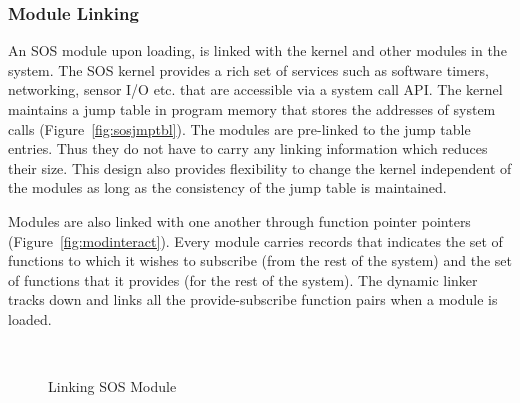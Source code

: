 \subsubsection{Module Linking}
\label{sec:soslinking}
%
An SOS module upon loading, is linked with the kernel and other
modules in the system. 
%
%
The SOS kernel provides a rich set of services such as software
timers, networking, sensor I/O etc. that are accessible via a system
call API.
%
The kernel maintains a jump table in program memory that stores the
addresses of system calls (Figure~\ref{fig:sosjmptbl}).
%
The modules are pre-linked to the jump table entries.
%
Thus they do not have to carry any linking information which reduces
their size.
%
This design also provides flexibility to change the kernel independent
of the modules as long as the consistency of the jump table is maintained.
%

Modules are also linked with one another through function pointer
pointers (Figure~\ref{fig:modinteract}).
%
Every module carries records that indicates the set of functions to
which it wishes to subscribe (from the rest of the system) and the set
of functions that it provides (for the rest of the system).
%
The dynamic linker tracks down and links all the provide-subscribe
function pairs when a module is loaded.
%
\begin{figure}[htpb]
 \centering
  \mbox{
    \hspace{0.2in}
  }
  \caption{Linking SOS Module}
\end{figure}   
%
